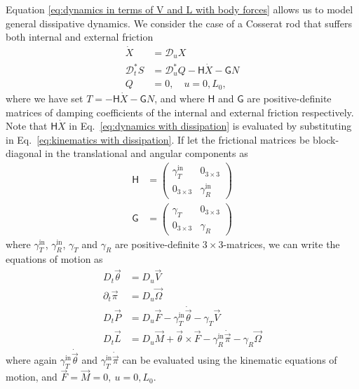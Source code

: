 Equation \ref{eq:dynamics in terms of V and L with body forces} allows us to model general dissipative dynamics. We consider the case of a Cosserat rod that suffers both internal and external friction
\begin{subequations} 
\begin{align}
\dot{X} & = \mathcal{D}_u X \label{eq:kinematics with dissipation} \\
\mathcal{D}^*_t S & = \mathcal{D}^*_u Q - \mathsf{H} \dot{X} - \mathsf{G} N \label{eq:dynamics with dissipation} \\
Q & = 0, \quad u = 0, L_0, 
\end{align}
\end{subequations}
where we have set $T = - \mathsf{H} \dot{X} - \mathsf{G} N$, and where $\mathsf{H}$ and $\mathsf{G}$ are positive-definite matrices of damping coefficients of the internal and external friction respectively. Note that $\mathsf{H} \dot{X}$ in Eq.~\ref{eq:dynamics with dissipation} is evaluated by substituting in Eq.~\ref{eq:kinematics with dissipation}. If let the frictional matrices be block-diagonal in the translational and angular components as
\begin{subequations} 
\begin{align}
\mathsf{H} & = \begin{pmatrix}
	\gamma^\text{in}_T & 0_{3 \times 3} \\
	0_{3 \times 3} & \gamma^\text{in}_R
\end{pmatrix} \\ 
\mathsf{G} & = \begin{pmatrix}
	\gamma_T & 0_{3 \times 3} \\
	0_{3 \times 3} & \gamma_R
\end{pmatrix}
\end{align}
\end{subequations}
where $\gamma^\text{in}_T$, $\gamma^\text{in}_R$, $\gamma_T$ and $\gamma_R$ are positive-definite $3 \times 3$-matrices, we can write the equations of motion as
\begin{subequations} \label{eq:underdamped cosserat rod}
\begin{align}
D_t \vec{\theta} & = D_u \vec{V} \\
\partial_t \vec{\pi} & = D_u \vec{\Omega} \\
D_t \vec{P} & = D_u \vec{F} - \gamma^\text{in}_T \dot{\vec{\theta}} - \gamma_T \vec{V} \\
D_t \vec{L} & = D_u \vec{M} + \vec{\theta} \times \vec{F}  - \gamma^\text{in}_R \dot{\vec{\pi}} - \gamma_R \vec{\Omega}
\end{align}
\end{subequations}
where again $\gamma^\text{in}_T \dot{\vec{\theta}}$ and $\gamma^\text{in}_T \dot{\vec{\pi}}$ can be evaluated using the kinematic equations of motion, and $\vec{F} = \vec{M} = 0,\ u= 0,L_0$.

